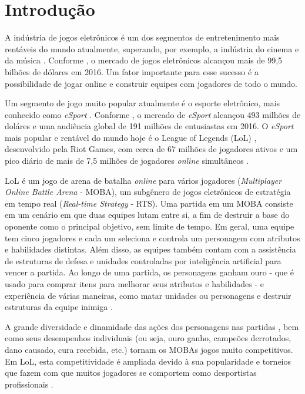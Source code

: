 \chapter{Introdu\c{c}\~{a}o}

A indústria de jogos eletrônicos é um dos segmentos de entretenimento mais rentáveis do mundo atualmente, superando, por exemplo, a indústria do cinema e da música \cite{newzoo1} \cite{ifpi1} \cite{mpaa1}. Conforme \cite{newzoo1}, o mercado de jogos eletrônicos alcançou mais de 99,5 bilhões de dólares em 2016. Um fator importante para esse sucesso é a possibilidade de jogar online e construir equipes com jogadores de todo o mundo.

Um segmento de jogo muito popular atualmente é o esporte eletrônico, mais conhecido como \textit{eSport} \cite{forbes1}. Conforme \cite{newzoo2}, o mercado de \textit{eSport} alcançou 493 milhões de doláres e uma audiência global de 191 milhões de entusiastas em 2016. O \textit{eSport} mais popular e rentável do mundo hoje é o League of Legends (LoL)  \cite{superdata1}, desenvolvido pela Riot Games, com cerca de 67 milhões de jogadores ativos e um pico diário de mais de 7,5 milhões de jogadores \textit{online} simultâneos \cite{riot1}.

LoL é um jogo de arena de batalha \textit{online} para vários jogadores (\textit{Multiplayer Online Battle Arena} - MOBA), um subgênero de jogos eletrônicos de estratégia em tempo real (\textit{Real-time Strategy} - RTS). Uma partida em um MOBA consiste em um cenário em que duas equipes lutam entre si, a fim de destruir a base do oponente como o principal objetivo, sem limite de tempo. Em geral, uma equipe tem cinco jogadores e cada um seleciona e controla um personagem com atributos e habilidades distintas. Além disso, as equipes também contam com a assistência de estruturas de defesa e unidades controladas por inteligência artificial para vencer a partida. Ao longo de uma partida, os personagens ganham ouro - que é usado para comprar itens para melhorar seus atributos e habilidades - e experiência de várias maneiras, como matar unidades ou personagens e destruir estruturas da equipe inimiga \cite{league1}.

A grande diversidade e dinamidade das ações dos personagens nas partidas \cite{drachen2014skill}, bem como seus desempenhos individuais (ou seja, ouro ganho, campeões derrotados, dano causado, cura recebida, etc.) tornam os MOBAs jogos muito competitivos. Em LoL, esta competitividade é ampliada devido à sua popularidade e torneios que fazem com que muitos jogadores se comportem como desportistas profissionais \cite{rioult2014mining}.

